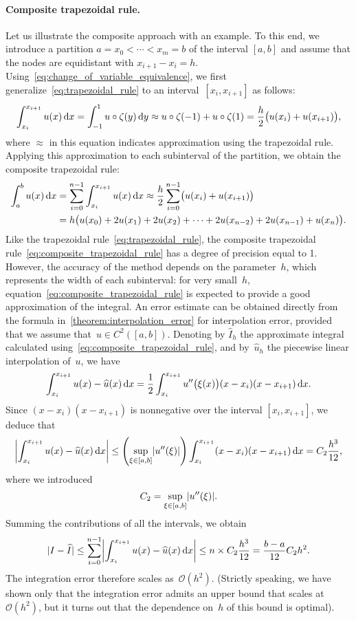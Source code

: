 \paragraph{Composite trapezoidal rule.}
Let us illustrate the composite approach with an example.
To this end,
we introduce a partition $a = x_0 < \dotsb < x_m = b$ of the interval $[a, b]$ and
assume that the nodes are equidistant with $x_{i+1} - x_i = h$.
Using~\eqref{eq:change_of_variable_equivalence},
we first generalize~\eqref{eq:trapezoidal_rule} to an interval~$[x_i, x_{i+1}]$ as follows:
\[
    \int_{x_i}^{x_{i+1}} u(x) \, \mathrm d x
    = \int_{-1}^{1} u \circ \zeta (y) \, \mathrm d y
    \approx u \circ \zeta(-1)  + u \circ \zeta(1)
    = \frac{h}{2} \bigl(u(x_i) + u(x_{i+1})\bigr),
\]
where $\approx$ in this equation indicates approximation using the trapezoidal rule.
Applying this approximation to each subinterval of the partition,
we obtain the composite trapezoidal rule:
\begin{align}
    \notag
    \int_{a}^{b} u(x) \, \mathrm d x
    &= \sum_{i=0}^{n-1} \int_{x_i}^{x_{i+1}} u(x) \, \mathrm d x
    \approx
    \frac{h}{2}\sum_{i=0}^{n-1} \bigl( u(x_i) + u(x_{i+1}) \bigr) \\
    \label{eq:composite_trapezoidal_rule}
    &= h \bigl( u(x_0) + 2 u(x_1) + 2 u(x_2) + \dotsb + 2 u(x_{n-2}) + 2 u(x_{n-1}) + u(x_n) \bigr).
\end{align}
Like the trapezoidal rule~\eqref{eq:trapezoidal_rule},
the composite trapezoidal rule~\eqref{eq:composite_trapezoidal_rule} has a degree of precision equal to 1.
However,
the accuracy of the method depends on the parameter~$h$,
which represents the width of each subinterval:
for very small~$h$,
equation~\eqref{eq:composite_trapezoidal_rule} is expected to provide a good approximation of the integral.
An error estimate can be obtained directly from the formula in~\cref{theorem:interpolation_error} for interpolation error,
provided that we assume that~$u \in C^2([a, b])$.
Denoting by $\widehat I_h$ the approximate integral calculated using~\eqref{eq:composite_trapezoidal_rule},
and by~$\widehat u_h$ the piecewise linear interpolation of~$u$,
we have
\[
    \int_{x_{i}}^{x_{i+1}} u(x) - \widehat u(x) \, \mathrm d x
    = \frac{1}{2} \int_{x_{i}}^{x_{i+1}} u''\bigl(\xi(x)\bigr) (x - x_{i}) (x - x_{i+1}) \, \mathrm d x.
\]
Since $(x - x_i) (x - x_{i+1})$ is nonnegative over the interval $[x_i, x_{i+1}]$,
we deduce that
\[
    \abs*{\int_{x_{i}}^{x_{i+1}} u(x) - \widehat u(x) \, \d x}
    \leq \left( \sup_{\xi \in [a, b]} \abs*{u''(\xi)} \right) \int_{x_{i}}^{x_{i+1}} (x - x_{i}) (x - x_{i+1}) \, \d x
    = C_2 \frac{h^3}{12},
\]
where we introduced
\[
    C_2 =  \sup_{\xi \in [a, b]} \abs*{u''(\xi)} .
\]
Summing the contributions of all the intervals,
we obtain
\[
    \abs{I - \widehat I}
    \leq \sum_{i=0}^{n-1} \abs*{\int_{x_i}^{x_{i+1}} u(x) - \widehat u(x) \, \d x }
    \leq n \times C_2 \frac{h^3}{12} = \frac{b-a}{12} C_2 h^2.
\]
The integration error therefore scales as~$\mathcal O(h^2)$.
(Strictly speaking, we have shown only that the integration error admits an upper bound that scales at $\mathcal O(h^2)$,
but it turns out that the dependence on~$h$ of this bound is optimal).

